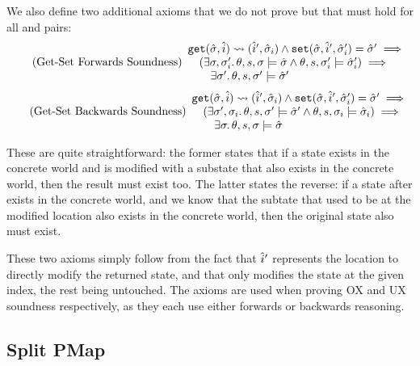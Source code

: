 We also define two additional axioms that we do not prove but that must hold for all  and  pairs:
\begin{equation}
\tag{Get-Set Forwards Soundness}\label{eq:getset-sound}
\begin{array}{l}
\texttt{get}(\hat{\sigma},\hat{i})\rightsquigarrow(\hat{i}', \hat{\sigma}_i) \land \texttt{set}(\hat{\sigma}, \hat{i}', \hat{\sigma}_i')=\hat{\sigma}' \implies \\
\quad (\exists \sigma,\sigma_i'\ldotp \theta,s,\sigma\models\hat{\sigma} \land \theta,s,\sigma_i'\models\hat{\sigma}_i') \implies \\
\qquad \exists \sigma'\ldotp \theta,s,\sigma'\models\hat{\sigma}'
\end{array}
\end{equation}
\begin{equation}
\tag{Get-Set Backwards Soundness}\label{eq:getset-sound}
\begin{array}{l}
\texttt{get}(\hat{\sigma},\hat{i})\rightsquigarrow(\hat{i}', \hat{\sigma}_i) \land \texttt{set}(\hat{\sigma}, \hat{i}', \hat{\sigma}_i')=\hat{\sigma}' \implies \\
\quad (\exists \sigma',\sigma_i\ldotp \theta,s,\sigma'\models\hat{\sigma}' \land \theta,s,\sigma_i\models\hat{\sigma}_i) \implies \\
\qquad \exists \sigma\ldotp \theta,s,\sigma\models\hat{\sigma}
\end{array}
\end{equation}

These are quite straightforward: the former states that if a state exists in the concrete world and is modified with a substate that also exists in the concrete world, then the result must exist too. The latter states the reverse: if a state after  exists in the concrete world, and we know that the subtate that used to be at the modified location also exists in the concrete world, then the original state also must exist.

These two axioms simply follow from the fact that $\hat{i}'$ represents the location to directly modify the returned state, and that  only modifies the state at the given index, the rest being untouched. The axioms are used when proving OX and UX soundness respectively, as they each use either forwards or backwards reasoning.

\subsection{Split PMap}

